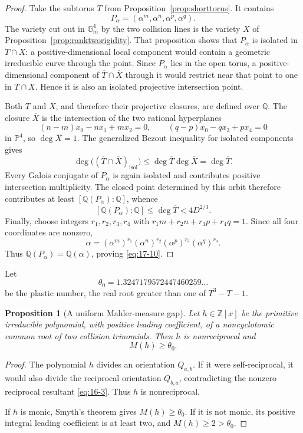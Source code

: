 \documentclass[11pt]{article}
\numberwithin{equation}{section}
\newtheorem{proposition}[theorem]{Proposition}
\theoremstyle{definition}
\newcommand{\Q}{\mathbb Q}
\newcommand{\Z}{\mathbb Z}
\begin{document}
\begin{proof}
Take the subtorus \(T\) from Proposition~\ref{prop:shorttorus}.  It contains
\[
 P_\alpha=(\alpha^m,\alpha^n,\alpha^p,\alpha^q).
\]
The variety cut out in \(\mathbb G_m^4\) by the two collision lines is the
variety \(X\) of Proposition~\ref{prop:ranktworigidity}.  That proposition
shows that \(P_\alpha\) is isolated in \(T\cap X\): a positive-dimensional
local component would contain a geometric irreducible curve through the
point.  Since \(P_\alpha\) lies in the open torus, a positive-dimensional
component of \(\overline T\cap\overline X\) through it would restrict near
that point to one in \(T\cap X\).  Hence it is also an isolated projective
intersection point.

Both \(T\) and \(X\), and therefore their projective closures, are defined
over \(\Q\).  The closure \(\overline X\) is the intersection of the two
rational hyperplanes
\[
 (n-m)x_0-nx_1+mx_2=0,
 \qquad
 (q-p)x_0-qx_3+px_4=0
\]
in \(\mathbb P^4\), so \(\deg\overline X=1\).  The generalized Bezout
inequality for isolated components
\cite[\S8.4]{Fulton1998} gives
\[
 \deg\bigl((\overline T\cap\overline X)_{\mathrm{isol}}\bigr)
 \leq\deg\overline T\deg\overline X=\deg\overline T.
\]
Every Galois conjugate of \(P_\alpha\) is again isolated and contributes
positive intersection multiplicity.  The closed point determined by this
orbit therefore contributes at least \([\Q(P_\alpha):\Q]\), whence
\[
 [\Q(P_\alpha):\Q]\leq\deg\overline T<4D^{2/3}.
\]
Finally, choose integers \(r_1,r_2,r_3,r_4\) with
\(r_1m+r_2n+r_3p+r_4q=1\).  Since all four coordinates are nonzero,
\[
 \alpha=(\alpha^m)^{r_1}(\alpha^n)^{r_2}
         (\alpha^p)^{r_3}(\alpha^q)^{r_4}.
\]
Thus \(\Q(P_\alpha)=\Q(\alpha)\), proving \eqref{eq:17-10}.
\end{proof}

Let
\[
 \theta_0=1.3247179572447460259\ldots
\]
be the plastic number, the real root greater than one of
\(T^3-T-1\).

\begin{proposition}[A uniform Mahler-measure gap]\label{prop:mahlergap}
Let \(h\in\Z[x]\) be the primitive irreducible polynomial, with positive
leading coefficient, of a noncyclotomic common root of two collision
trinomials.  Then \(h\) is nonreciprocal and
\begin{equation}
 M(h)\geq\theta_0.
 \label{eq:17-11}
\end{equation}
\end{proposition}

\begin{proof}
The polynomial \(h\) divides an orientation \(Q_{a,b}\).  If it were
self-reciprocal, it would also divide the reciprocal orientation
\(Q_{b,a}\), contradicting the nonzero reciprocal resultant \eqref{eq:16-3}.
Thus \(h\) is nonreciprocal.

If \(h\) is monic, Smyth's theorem \cite{Smyth1971} gives
\(M(h)\geq\theta_0\).  If it is not monic, its positive integral leading
coefficient is at least two, and
\(M(h)\geq2>\theta_0\).
\end{proof}
\end{document}

